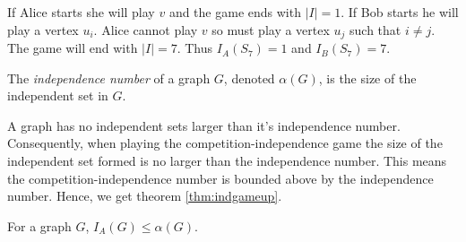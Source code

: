 If Alice starts she will play $v$ and the game ends with $|I| = 1$. If Bob starts he will play a vertex $u_i$. Alice cannot play $v$ so must play a vertex $u_j$ such that $i\neq j$. The game will end with $|I| = 7$. Thus $I_A(S_7)=1$ and $I_B(S_7)=7$.

\begin{definition}
    The \textit{independence number} of a graph $G$, denoted $\alpha(G)$, is the size of the independent set in $G$.
\end{definition}

A graph has no independent sets larger than it's independence number. Consequently, when playing the competition-independence game the size of the independent set formed is no larger than the  independence number. This means the competition-independence number is bounded above by the independence number. Hence, we get theorem \ref{thm:indgameup}.

\begin{theorem}\label{thm:indgameup}
    For a graph $G$, $I_A(G)\leq \alpha(G)$.    
\end{theorem}


%
%
%
%












